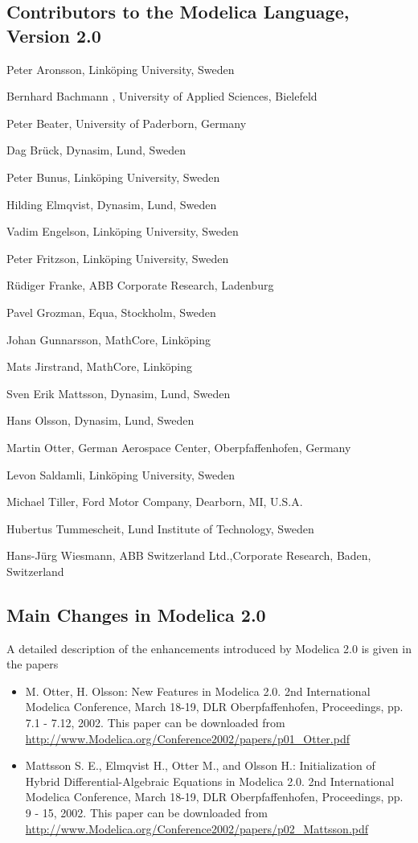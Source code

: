 \subsection{Contributors to the Modelica Language, Version 2.0}
\indent\indent
Peter Aronsson, Linköping University, Sweden

Bernhard Bachmann , University of Applied Sciences, Bielefeld

Peter Beater, University of Paderborn, Germany

Dag Brück, Dynasim, Lund, Sweden

Peter Bunus, Linköping University, Sweden

Hilding Elmqvist, Dynasim, Lund, Sweden

Vadim Engelson, Linköping University, Sweden

Peter Fritzson, Linköping University, Sweden

Rüdiger Franke, ABB Corporate Research, Ladenburg

Pavel Grozman, Equa, Stockholm, Sweden

Johan Gunnarsson, MathCore, Linköping

Mats Jirstrand, MathCore, Linköping

Sven Erik Mattsson, Dynasim, Lund, Sweden

Hans Olsson, Dynasim, Lund, Sweden

Martin Otter, German Aerospace Center, Oberpfaffenhofen, Germany

Levon Saldamli, Linköping University, Sweden

Michael Tiller, Ford Motor Company, Dearborn, MI, U.S.A.

Hubertus Tummescheit, Lund Institute of Technology, Sweden

Hans-Jürg Wiesmann, ABB Switzerland Ltd.,Corporate Research, Baden,
Switzerland

\subsection{Main Changes in Modelica 2.0}

A detailed description of the enhancements introduced by Modelica 2.0 is
given in the papers

\begin{itemize}
\item
  M. Otter, H. Olsson: New Features in Modelica 2.0. 2nd International
  Modelica Conference, March 18-19, DLR Oberpfaffenhofen, Proceedings,
  pp. 7.1 - 7.12, 2002. This paper can be downloaded from
  \url{http://www.Modelica.org/Conference2002/papers/p01\_Otter.pdf}
\item
  Mattsson S. E., Elmqvist H., Otter M., and Olsson H.: Initialization
  of Hybrid Differential-Algebraic Equations in Modelica 2.0. 2nd
  International Modelica Conference, March 18-19, DLR Oberpfaffenhofen,
  Proceedings, pp. 9 - 15, 2002. This paper can be downloaded from
  \url{http://www.Modelica.org/Conference2002/papers/p02\_Mattsson.pdf}
\end{itemize}

